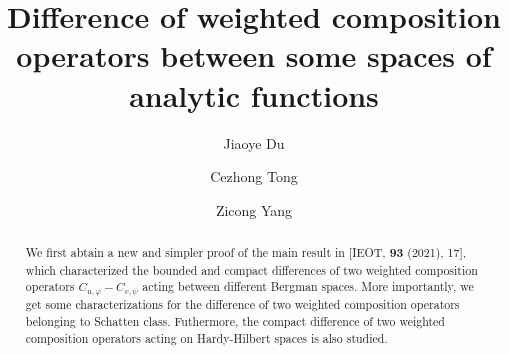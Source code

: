 \documentclass[preprint,12pt,times]{elsarticle}
\theoremstyle{definition}
\theoremstyle{remark}
\numberwithin{equation}{section}
\begin{document}
\begin{frontmatter}



\title{Difference of weighted composition operators between some spaces of analytic functions} %

\author{Jiaoye Du}

\author{Cezhong Tong}


\author{Zicong Yang} %


\begin{abstract}
We first abtain a new and simpler proof of the main result in [IEOT, \textbf{93} (2021), 17], which characterized the bounded and compact differences of two weighted composition operators $C_{u,\varphi}-C_{v,\psi}$ acting between different Bergman spaces. More importantly, we get some characterizations for the difference of two weighted composition operators belonging to Schatten class. Futhermore, the compact difference of two weighted composition operators acting on Hardy-Hilbert spaces is also studied.
\end{abstract}


\end{frontmatter}
\end{document}
